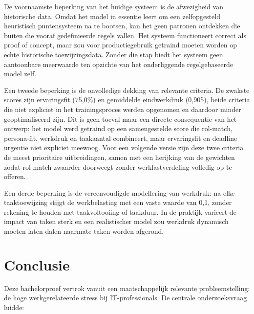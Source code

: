 De voornaamste beperking van het huidige systeem is de afwezigheid van historische data. Omdat het model in essentie leert om een zelfopgesteld heuristisch puntensysteem na te bootsen, kan het geen patronen ontdekken die buiten die vooraf gedefinieerde regels vallen. Het systeem functioneert correct als proof of concept, maar zou voor productiegebruik getraind moeten worden op echte historische toewijzingsdata. Zonder die stap biedt het systeem geen aantoonbare meerwaarde ten opzichte van het onderliggende regelgebaseerde model zelf.

Een tweede beperking is de onvolledige dekking van relevante criteria. De zwakste scores zijn ervaringsfit (75,0\%) en gemiddelde eindwerkdruk (0,905), beide criteria die niet expliciet in het trainingsproces werden opgenomen en daardoor minder geoptimaliseerd zijn. Dit is geen toeval maar een directe consequentie van het ontwerp: het model werd getraind op een samengestelde score die rol-match, persona-fit, werkdruk en taakaantal combineert, maar ervaringsfit en deadline urgentie niet expliciet meewoog. Voor een volgende versie zijn deze twee criteria de meest prioritaire uitbreidingen, samen met een herijking van de gewichten zodat rol-match zwaarder doorweegt zonder werklastverdeling volledig op te offeren.

Een derde beperking is de vereenvoudigde modellering van werkdruk: na elke taaktoewijzing stijgt de werkbelasting met een vaste waarde van 0,1, zonder rekening te houden met taakvoltooiing of taakduur. In de praktijk varieert de impact van taken sterk en een realistischer model zou werkdruk dynamisch moeten laten dalen naarmate taken worden afgerond.

\chapter{Conclusie}%
\label{ch:conclusie}
\vspace{1em}Deze bachelorproef vertrok vanuit een maatschappelijk relevante probleemstelling: de hoge werkgerelateerde stress bij IT-professionals. De centrale onderzoeksvraag luidde:

